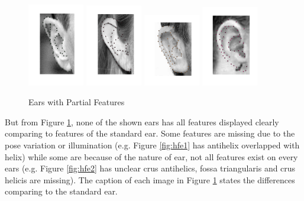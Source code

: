 \begin{itemize}
\begin{figure}[ht]
    \centering
    \includegraphics[width=0.22\textwidth]{resources/Background/hidden_feature_ear} 
    \hfill
    \includegraphics[width=0.22\textwidth]{resources/Background/hidden_feature_ear2} 
    \hfill
    \includegraphics[width=0.22\textwidth]{resources/Background/hidden_feature_ear3} 
    \hfill
    \includegraphics[width=0.22\textwidth]{resources/Background/hidden_feature_ear4} 
    \caption{Ears with Partial Features}
    \label{fig:hfe}
\end{figure}

But from Figure \ref{fig:hfe}, none of the shown ears has all features displayed clearly comparing to features of the standard ear. Some features are missing due to the pose variation or illumination (e.g. Figure \ref{fig:hfe1} has antihelix overlapped with helix) while some are because of the nature of ear, not all features exist on every ears (e.g. Figure \ref{fig:hfe2} has unclear crus antihelics, fossa triangularis and crus helicis are missing). The caption of each image in Figure \ref{fig:hfe} states the differences comparing to the standard ear.


\end{itemize}
